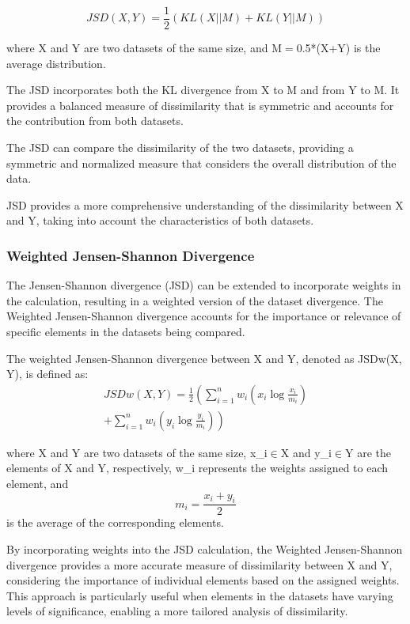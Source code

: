 \[JSD(X, Y) = \frac{1}{2} \left( KL(X || M)
  + KL(Y || M) \right)\]

where X and Y are two datasets of the same size, and M$=$0.5*(X+Y) is the average distribution.

The JSD incorporates both the KL divergence from X to M and from Y to M. It provides a balanced measure of dissimilarity that is symmetric and accounts for the contribution from both datasets.

The JSD can compare the dissimilarity of the two datasets, providing a symmetric and normalized measure that considers the overall distribution of the data.

JSD provides a more comprehensive understanding of the dissimilarity between X and Y, taking into account the characteristics of both datasets.

\subsubsection{Weighted Jensen-Shannon Divergence}

The Jensen-Shannon divergence (JSD) can be extended to incorporate weights in the calculation, resulting in a weighted version of the dataset divergence. The Weighted Jensen-Shannon divergence accounts for the importance or relevance of specific elements in the datasets being compared.

The weighted Jensen-Shannon divergence between X and Y, denoted as JSDw(X, Y), is defined as:
\begin{align*}
  JSDw(X, Y) = \frac{1}{2} \left( \sum_{i=1}^{n} w_i \left( x_i \log \frac{x_i}{m_i} \right) \right. \\
  \left. + \sum_{i=1}^{n} w_i \left( y_i \log \frac{y_i}{m_i} \right) \right)
\end{align*}

where X and Y are two datasets of the same size, x\_i$\in$X and y\_i$\in$Y are the elements of X and Y, respectively, w\_i represents the weights assigned to each element, and \[m_i = \frac{{x_i + y_i}}{2}\] is the average of the corresponding elements.

By incorporating weights into the JSD calculation, the Weighted Jensen-Shannon divergence provides a more accurate measure of dissimilarity between X and Y, considering the importance of individual elements based on the assigned weights. This approach is particularly useful when elements in the datasets have varying levels of significance, enabling a more tailored analysis of dissimilarity.



